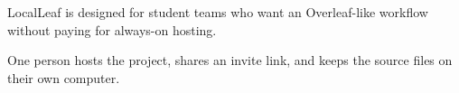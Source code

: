 LocalLeaf is designed for student teams who want an Overleaf-like workflow without paying for always-on hosting.

One person hosts the project, shares an invite link, and keeps the source files on their own computer.
